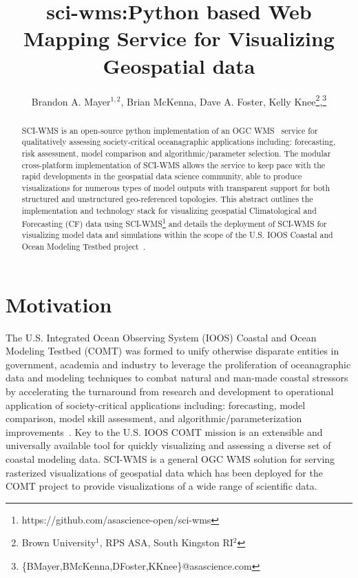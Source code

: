 \documentclass[11pt,twocolumn,twoside]{IEEEtran}
\newcommand{\comt}{COMT}
\newcommand{\ioos}{IOOS}
\newcommand{\ogc}{OGC}
\newcommand{\wms}{WMS}
\newcommand{\sciwms}{SCI-WMS}
\begin{document}
\title{\vspace{0.2in}\sc sci-wms:Python based Web Mapping Service for Visualizing Geospatial data}


\author{Brandon A. Mayer$^{1,2}$, Brian McKenna, Dave A. Foster, Kelly Knee\thanks{Brown University$^{1}$, RPS ASA, South Kingston RI$^{2}$},\thanks{\{BMayer,BMcKenna,DFoster,KKnee\}@asascience.com}}

\maketitle
\thispagestyle{fancy}

\begin{abstract}
\sciwms{} is an open-source python implementation of an \ogc{}
\wms{}~\cite{wms14} service for qualitatively assessing
society-critical oceanagraphic applications including: forecasting,
risk assessment, model comparison and algorithmic/parameter
selection. The modular cross-platform implementation of \sciwms{}
allows the service to keep pace with the rapid developments in the
geospatial data science community, able to produce visualizations for
numerous types of model outputs with transparent support for both
structured and unstructured geo-referenced topologies. This abstract
outlines the implementation and technology stack for visualizing
geospatial Climatological and Forecasting (CF) data using
\sciwms{}\footnote{https://github.com/asascience-open/sci-wms} and
details the deployment of \sciwms{} for visualizing model data and
simulations within the scope of the U.S. \ioos{} Coastal and Ocean
Modeling Testbed project~\cite{luettich13}.
\end{abstract}

\section{Motivation}
The U.S. Integrated Ocean Observing System (\ioos{}) Coastal and Ocean
Modeling Testbed (\comt{}) was formed to unify otherwise disparate
entities in government, academia and industry to leverage the
proliferation of oceanagraphic data and modeling techniques to combat
natural and man-made coastal stressors by accelerating the turnaround
from research and development to operational application of
society-critical applications including: forecasting, model
comparison, model skill assessment, and algorithmic/parameterization
improvements~\cite{luettich13}. Key to the U.S. \ioos{} \comt{}
mission is an extensible and universally available tool for quickly
visualizing and assessing a diverse set of coastal modeling
data. \sciwms{} is a general \ogc{} \wms{} solution for serving
rasterized visualizations of geospatial data which has been deployed
for the \comt{} project to provide visualizations of a wide range of
scientific data.
\end{document}
